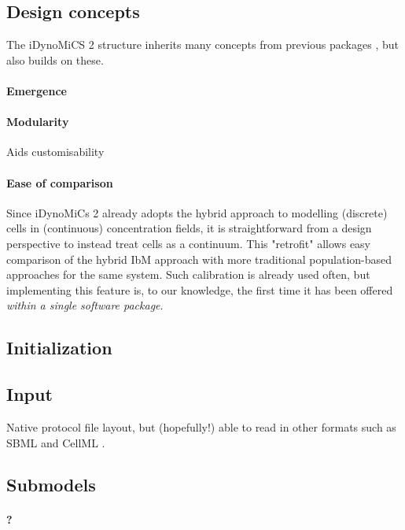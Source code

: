 \documentclass[10pt,letterpaper]{article}
\begin{document}
\subsection*{Design concepts}
The iDynoMiCS 2 structure inherits many concepts from previous packages \cite{bacsim, idyno1}, but also builds on these.
\paragraph{Emergence}


\paragraph{Modularity}
Aids customisability

\paragraph{Ease of comparison}
Since iDynoMiCs 2 already adopts the hybrid approach to modelling (discrete) cells in (continuous) concentration fields, it is straightforward from a design perspective to instead treat cells as a continuum. This "retrofit" allows easy comparison of the hybrid IbM approach with more traditional population-based approaches \cite{wanner1986}
for the same system. Such calibration is already used often,
but implementing this feature is, to our knowledge, the first time it has been offered \textit{within a single software package}.

\subsection*{Initialization}

\subsection*{Input}
Native protocol file layout, but (hopefully!) able to read in other formats such as SBML \cite{sbml} and CellML \cite{cellml}.


\subsection*{Submodels}
\paragraph{?}
\end{document}
